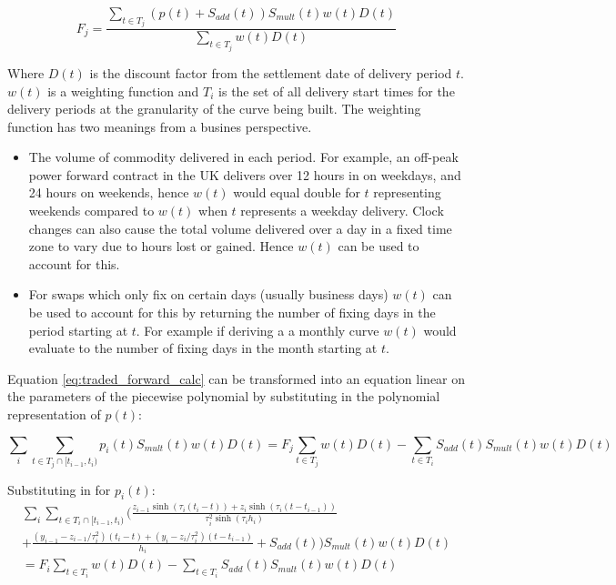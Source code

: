 \documentclass{article}
\begin{document}
\begin{equation}
    \label{eq:traded_forward_calc}
    F_j = \frac{\sum_{t \in T_j} (p(t) + S_{add}(t))S_{mult}(t)w(t)D(t)}
    {\sum_{t \in T_j} w(t)D(t)}
\end{equation}

Where $D(t)$ is the discount factor from the settlement date of delivery period $t$.
$w(t)$ is a weighting function and $T_i$ is the set of all delivery start times
for the delivery periods at the granularity of the curve being built. The weighting function has two
meanings from a busines perspective.
\begin{itemize}
    \item The volume of commodity delivered in each period. For example, an off-peak power forward 
    contract in the UK delivers over 12 hours in on weekdays, and 24 hours on weekends, hence $w(t)$ 
    would equal double for $t$ representing weekends compared to $w(t)$ when $t$ represents a weekday delivery. 
    Clock changes can also cause the total volume delivered over a day in a fixed time zone to vary 
    due to hours lost or gained. Hence $w(t)$ can be used to account for this.
    \item For swaps which only fix on certain days (usually business days) $w(t)$ can be used to account 
    for this by returning the number of fixing days in the period starting at $t$.
    For example if deriving a a monthly curve $w(t)$ would evaluate to the number of fixing days in the 
    month starting at $t$.
\end{itemize}
Equation \ref{eq:traded_forward_calc} can be transformed into an equation linear on the parameters of the piecewise polynomial by substituting
in the polynomial representation of $p(t)$:

\begin{equation}
    \sum_i \sum_{t \in T_j \cap  [t_{i-1}, t_i) } p_i(t) S_{mult}(t)w(t)D(t) = 
    F_j \sum_{t \in T_j} w(t) D(t) - \sum_{t \in T_i} S_{add}(t) S_{mult}(t)w(t)D(t)
\end{equation}



Substituting in for $p_i(t)$:
\begin{multline}
    \sum_i \sum_{t \in T_i \cap  [t_{i-1}, t_i)} \biggl( \frac{z_{i-1} \sinh(\tau_i (t_i - t)) + z_i \sinh(\tau_i (t - t_{i-1}))}{\tau_i^2 \sinh(\tau_i h_i)}  \\
    + \frac{(y_{i-1} - z_{i-1}/\tau_i^2)(t_i - t) + (y_i - z_i/\tau_i^2)(t - t_{i-1})}{h_i} + 
    S_{add}(t) \biggr) S_{mult}(t)w(t)D(t) \\
    = F_i \sum_{t \in T_i} w(t)D(t) - \sum_{t \in T_i} S_{add}(t) S_{mult}(t)w(t)D(t)
\end{multline}
\end{document}
